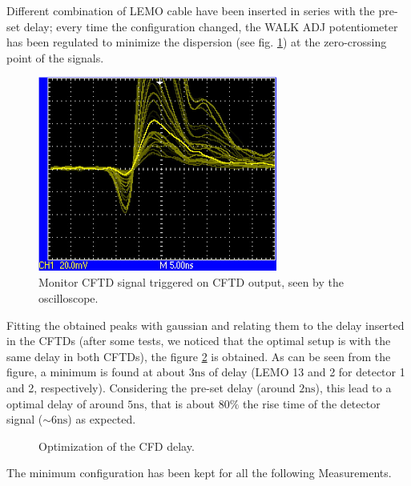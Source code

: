 \documentclass[11pt,a4 paper]{article}
\begin{document}
Different combination of LEMO cable have been inserted in series with the pre-set delay; every time the configuration changed, the WALK ADJ potentiometer has been regulated to minimize the dispersion (see fig. \ref{fig:oscilloscope}) at the zero-crossing point of the signals.

\begin{figure}[H]
    \centering
    \includegraphics[width=0.7\textwidth]{img/oscilloscope.jpg}
    \caption{Monitor CFTD signal triggered on CFTD output, seen by the oscilloscope.}
    \label{fig:oscilloscope}
\end{figure}

Fitting the obtained peaks with gaussian and relating them to the delay inserted in the CFTDs (after some tests, we noticed that the optimal setup is with the same delay in both CFTDs), the figure \ref{fig:CFD:delay} is obtained. As can be seen from the figure, a minimum is found at about $3\si{\nano\second}$ of delay (LEMO 13 and 2 for detector 1 and 2, respectively). Considering the pre-set delay (around $2\si{\nano\second}$), this lead to a optimal delay of around $5\si{\nano\second}$, that is about $80\%$ the rise time of the detector signal ($\sim6\si{\nano\second}$) as expected.

\begin{figure}[H]
    \centering
    \caption{Optimization of the CFD delay.}
    \label{fig:CFD:delay}
\end{figure}

The minimum configuration has been kept for all the following Measurements.
\end{document}
